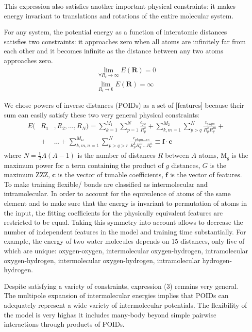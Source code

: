 \documentclass[aps,prl,reprint,amsmath,amssymb,nature]{revtex4-1}
\begin{document}
This expression also satisfies another important physical constraints: it makes energy invariant to translations and rotations of the entire molecular system. 

For any system, the potential energy as a function of interatomic distances satisfies two constraints: it approaches zero when all atoms are infinitely far from each other and it becomes infinite as the distance between any two atoms approaches zero.
%
\begin{eqnarray}
\lim_{\forall R_i \rightarrow \infty} E (\mathbf{R}) = 0 \\
\lim_{R_i \rightarrow 0} E (\mathbf{R}) = \infty
\end{eqnarray}

We chose powers of inverse distances (POIDs) as a set of [features] because their sum can easily satisfy these two very general physical constraints:
\begin{eqnarray}
E (&R_1&, R_2, \ldots, R_N) = \sum_{k=1}^{M_1} \sum_{p=1}^{N} \frac{c_{pk}}{R_p^k} + \sum_{k,m=1}^{M_2} \sum_{p>q}^{N} \frac{c_{pkqm}}{R_p^k R_q^m} + \nonumber \\
&+& \ldots +\sum_{k,m,n=1}^{M_G} \sum_{p>q>r}^{N} \frac{c_{pkqm\ldots rn}}{R_p^k R_q^m \ldots R_r^n} \equiv \mathbf{f}\cdot \mathbf{c}
\end{eqnarray}
%
where $N = \frac{1}{2}A(A-1)$ is the number of distances $R$ between $A$ atoms, M$_{g}$ is the maximum power for a term containing the product of $g$ distances, $G$ is the maximum ZZZ, $\mathbf{c}$ is the vector of tunable coefficients, $\mathbf{f}$ is the vector of features. 
\red To make training flexible/ bonds are classified as intermolecular and intramolecular. \old 
In order to account for the equivalence of atoms of the same element and to make sure that the energy is invariant to permutation of atoms in the input, the fitting coefficients for the physically equivalent features are restricted to be equal. 
Taking this symmetry into account allows to decrease the number of independent features in the model and training time substantially. 
For example, the energy of two water molecules depends on 15 distances, only five of which are unique: oxygen-oxygen, intermolecular oxygen-hydrogen, intramolecular oxygen-hydrogen, intermolecular oxygen-hydrogen, intramolecular hydrogen-hydrogen.

Despite satisfying a variety of constraints, expression (3) remains very general. 
The multipole expansion of intermolecular energies implies that POIDs can adequately represent a wide variety of intermolecular potentials. 
The flexibility of the model \red is very high\old as it includes many-body beyond simple pairwise interactions through products 
of POIDs.
\end{document}
